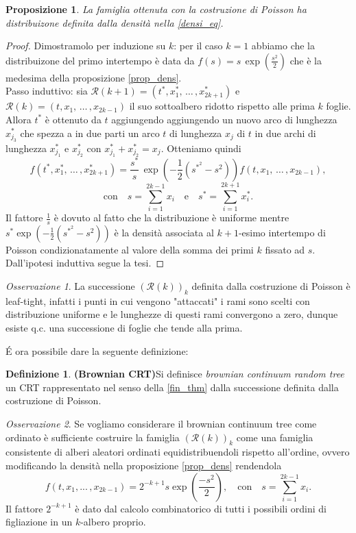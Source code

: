 \documentclass[11pt, twoside]{report}
\newcommand{\Rr}{\mathscr{R}}
\theoremstyle{definition}
\newtheorem{definizione}{Definizione}[chapter]
\theoremstyle{plain}
\newtheorem{prop}[teo]{Proposizione}
\theoremstyle{remark}
\newtheorem{oss}{Osservazione}[chapter]
\numberwithin{equation}{chapter}
\begin{document}
\begin{prop}
La famiglia ottenuta con la costruzione di Poisson ha distribuizone definita dalla densità nella \eqref{densi_eq}. 
\end{prop}
\begin{proof}
Dimostramolo per induzione su $k$: per il caso $k=1$ abbiamo che la distribuizone del primo intertempo è data da $f(s)=s\, \exp\left(\frac{s^2}{2}\right)$ che è la medesima della proposizione \ref{prop_dens}.\\
Passo induttivo: sia $\Rr(k+1)=(t^*,x_1^*, \, \dots \,, x_{2k+1}^*)$ e $\Rr(k)=(t, x_1, \, \dots \, ,x_{2k-1})$ il suo sottoalbero ridotto rispetto alle prima $k$ foglie. Allora $t^*$ è ottenuto da $t$ aggiungendo aggiungendo un nuovo arco di lunghezza $x_{j_3}^*$ che spezza a in due parti un arco $t$ di lunghezza $x_j$ di $t$ in due archi di lunghezza $x_{j_1}^*$ e $x_{j_2}^*$ con $x_{j_1}^*+x_{j_2}^*=x_j$. Otteniamo quindi
$$f(t^*,x_1^*, \, \dots \,, x_{2k+1}^*)=\frac{s^*}{s} \, \exp\left(-\frac{1}{2}\left(s^{*^2}-s^2\right)\right)f(t, x_1, \, \dots \, ,x_{2k-1}),$$
$$\text{con} \quad s=\stackrel{2k-1}{\sum\limits_{i=1}} x_i \quad \text{e} \quad s^*=\stackrel{2k+1}{\sum\limits_{i=1}}x^*_i.$$
Il fattore $\frac{1}{s}$ è dovuto al fatto che la distribuzione è uniforme mentre $s^* \exp\left(-\frac{1}{2}\left(s^{*^2}-s^2\right)\right)$ è la densità associata al $k+1$-esimo intertempo di Poisson condizionatamente al valore della somma dei primi $k$ fissato ad $s$. Dall'ipotesi induttiva segue la tesi.
\end{proof}
\begin{oss}
La successione $(\Rr(k))_k$ definita dalla costruzione di Poisson è leaf-tight, infatti i punti in cui vengono "attaccati" i rami sono scelti con distribuzione uniforme e le lunghezze di questi rami convergono a zero, dunque esiste q.c. una successione di foglie che tende alla prima.
\end{oss}
\'E ora possibile dare la seguente definizione:
\begin{definizione}{\textbf{(Brownian CRT)}}\label{def_bcrt}
Si definisce \textit{brownian continuum random tree} un CRT rappresentato nel senso della \ref{fin_thm} dalla successione definita dalla costruzione di Poisson.
\end{definizione}
\begin{oss}
Se vogliamo considerare il brownian continuum tree come ordinato è sufficiente costruire la famiglia $(\Rr(k))_k$ come una famiglia consistente di alberi aleatori ordinati equidistribuendoli rispetto all'ordine, ovvero modificando la densità nella proposizione \ref{prop_dens} rendendola
$$f(t, x_1, ...\, ,x_{2k-1})=2^{-k+1}s \exp\left(\frac{-s^2}{2}\right), \quad \text{con} \quad s=\stackrel{2k-1}{\sum\limits_{i=1}}x_i.$$
Il fattore $2^{-k+1}$ è dato dal calcolo combinatorico di tutti i possibili ordini di figliazione in un $k$-albero proprio.
\end{oss}
\end{document}
